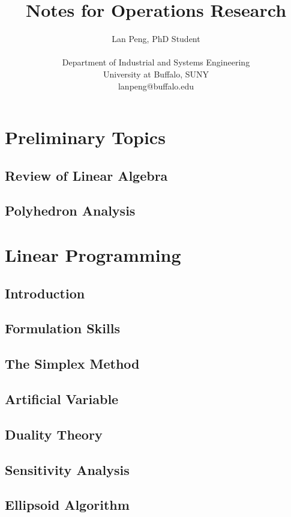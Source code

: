 \documentclass[10pt]{book}
\author{Lan Peng, PhD Student\\ \\Department of Industrial and Systems Engineering\\University at Buffalo, SUNY\\lanpeng@buffalo.edu}
\title{Notes for Operations Research}
\begin{document}
\maketitle
\tableofcontents

\part{Preliminary Topics}
	\chapter{Review of Linear Algebra}

	\chapter{Polyhedron Analysis}
	
\part{Linear Programming}
	\chapter{Introduction}

	\chapter{Formulation Skills}

	\chapter{The Simplex Method}

	\chapter{Artificial Variable}

	\chapter{Duality Theory}

	\chapter{Sensitivity Analysis}

	\chapter{Ellipsoid Algorithm}
\end{document}
